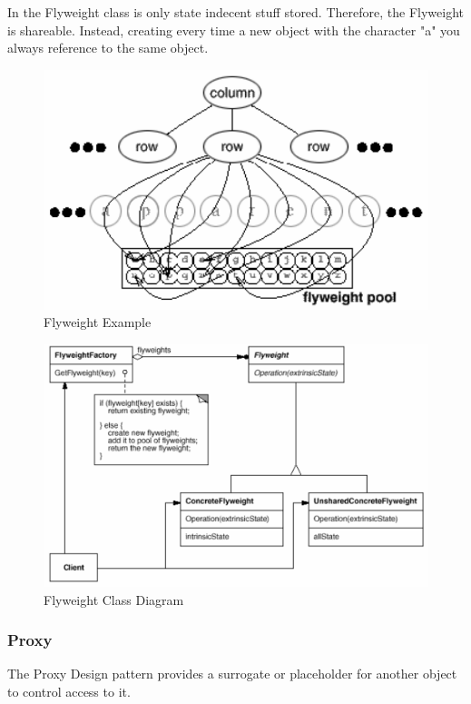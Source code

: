 \documentclass[11pt]{article}
\begin{document}
In the Flyweight class is only state indecent stuff stored.
Therefore, the Flyweight is shareable.
Instead, creating every time a new object with the character "a" you always reference to the same object.


\begin{figure}[htbp]
\centering
\includegraphics[width=.9\linewidth]{img/flyweight_example.png}
\caption{\label{fig:flyweight-example}Flyweight Example}
\end{figure}


\begin{figure}[htbp]
\centering
\includegraphics[width=.9\linewidth]{img/flyweight.png}
\caption{\label{fig:flyweight-class-diagram}Flyweight Class Diagram}
\end{figure}

\subsubsection{Proxy}
\label{sec:orgda5e1c9}
The Proxy Design pattern provides a surrogate or placeholder for another object to control access to it.
\end{document}
